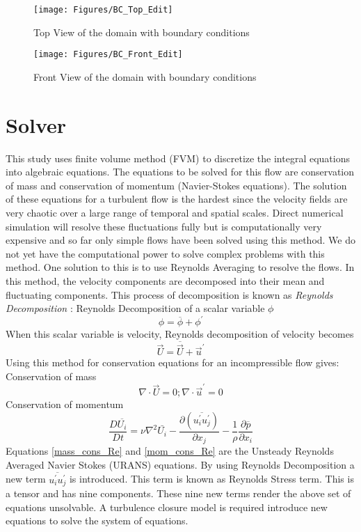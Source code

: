 \begin{figure}
\centering
\texttt{[image: Figures/BC\_Top\_Edit]}
\caption{Top View of the domain with boundary conditions}\label{fig:BC_Top}
\bigbreak
\texttt{[image: Figures/BC\_Front\_Edit]}
\caption{Front View of the domain with boundary conditions}\label{fig:BC_Front}
\end{figure}

\section{Solver}\label{Solver}
This study uses finite volume method (FVM) to discretize the integral equations into algebraic equations. The equations to be solved for this flow are conservation of mass and conservation of momentum (Navier-Stokes equations). The solution of these equations for a turbulent flow is the hardest since the velocity fields are very chaotic over a large range of temporal and spatial scales. Direct numerical simulation will resolve these fluctuations fully but is computationally very expensive and so far only simple flows have been solved using this method. We do not yet have the computational power to solve complex problems with this method. One solution to this is to use Reynolds Averaging to resolve the flows. In this method, the velocity components are decomposed into their mean and fluctuating components. This process of decomposition is known as \textit{Reynolds Decomposition} \cite{Reference9}:
Reynolds Decomposition of a scalar variable $\phi$
\begin{equation}
\phi = \overline{\phi} + \phi^\prime
\end{equation}
When this scalar variable is velocity, Reynolds decomposition of velocity becomes
\begin{equation}
\vec{U} = \overline{\vec{U}} + \vec{u}^\prime
\end{equation}
Using this method for conservation equations for an incompressible flow gives:
Conservation of mass
\begin{equation}
\nabla \cdot \vec{U} = 0; \nabla \cdot \vec{u}^\prime = 0 \label{mass_cons_Re}
\end{equation}
Conservation of momentum
\begin{equation}
\frac{D \overline{U_i}}{Dt} = \nu \nabla^2 \bar{U_i} - \frac{\partial(\overline{u_i^\prime u_j^\prime})}{\partial x_j} - \frac{1}{\rho} \frac{\partial \overline{p}}{\partial x_i} \label{mom_cons_Re}
\end{equation}
Equations \ref{mass_cons_Re} and \ref{mom_cons_Re} are the Unsteady Reynolds Averaged Navier Stokes (URANS) equations. By using Reynolds Decomposition a new term $\overline{u_i^\prime u_j^\prime}$ is introduced. This term is known as Reynolds Stress term. This is a tensor and has nine components. These nine new terms render the above set of equations unsolvable. A turbulence closure model is required introduce new equations  to solve the system of equations. 
